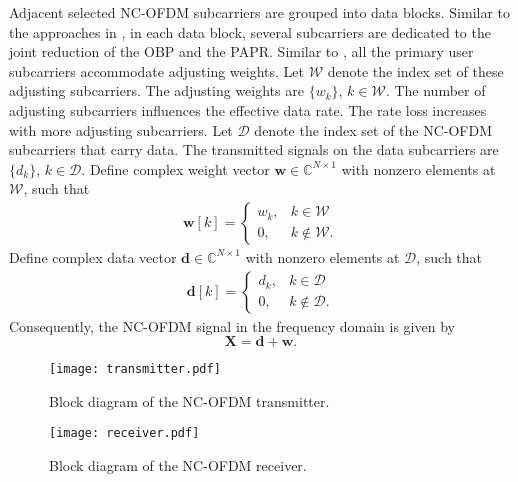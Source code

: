 \documentclass[paper]{ieice}
\begin{document}
Adjacent selected NC-OFDM subcarriers are grouped into data blocks.  Similar to the approaches in \cite{5424082,4411634}, in each data block, several subcarriers are dedicated to the joint reduction of the OBP and the PAPR.  Similar to \cite{ni2015joint}, all the primary user subcarriers accommodate adjusting weights.
Let $\mathcal{W}$ denote the index set of these adjusting subcarriers. The adjusting weights are $\{w_{k}\}$, $k \in \mathcal{W}$. The number of adjusting subcarriers influences the effective data rate. The rate loss increases with more adjusting subcarriers. Let $\mathcal{D}$ denote the index set of the NC-OFDM subcarriers that carry data.  The transmitted signals on the data subcarriers are $\{d_{k}\}$, $k \in \mathcal{D}$.  %
Define complex weight vector $\mathbf{w} \in \mathbb{C}^{N \times 1}$ with nonzero elements at $\mathcal{W}$, such that
\begin{eqnarray}
\mathbf{w}[k] = \left\{\begin{array}{cc}
w_{k}, & k\in \mathcal{W} \\
0, & k \notin \mathcal{W}.
\end{array} \right.\label{eq:w_p1}
\end{eqnarray}
Define complex data vector $\mathbf{d} \in \mathbb{C}^{N \times 1}$ with nonzero elements at $\mathcal{D}$, such that
\begin{eqnarray} \label{eq:d}
\mathbf{d}[k] = \left\{\begin{array}{cc}
d_k, & k\in \mathcal{D} \\
0, & k \notin \mathcal{D}.
\end{array} \right.
\end{eqnarray}
Consequently, the NC-OFDM signal in the frequency domain is given by
\begin{equation}
{\mathbf{X}} = \mathbf{d} + \mathbf{w}.
\end{equation}

\begin{figure}[t]
\begin{center}
\texttt{[image: transmitter.pdf]}
\end{center}
\caption{Block diagram of the NC-OFDM transmitter.}
\label{fig:transmitter}
\end{figure}

\begin{figure}[t]
\begin{center}
\texttt{[image: receiver.pdf]}
\end{center}
\caption{Block diagram of the NC-OFDM receiver.}
\label{fig:receiver}
\end{figure}
\end{document}
